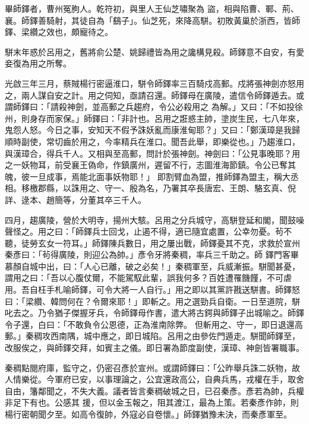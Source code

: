 \begin{pinyinscope}
 畢師鐸者，曹州冤朐人。乾符初，與里人王仙芝嘯聚為
 盜，相與陷曹、鄆、荊、襄。師鐸善騎射，其徒自為「鷂子」。仙芝死，來降高駢。初敗黃巢於浙西，皆師鐸、梁纘之效也，頗寵待之。



 駢末年惑於呂用之，舊將俞公楚、姚歸禮皆為用之讒構見殺。師鐸意不自安，有愛妾復為用之所奪。



 光啟三年三月，蔡賊楊行密逼淮口，駢令師鐸率三百騎戍高郵。戍將張神劍亦怒用之，兩人謀自安之計。用之伺知，亟請召還。師鐸母在廣陵，遣信令師鐸遁去。或謂師鐸曰：「請殺神劍，並高郵之兵趨府，令公必殺用之
 為解。」又曰：「不如投徐州，則身存而家保。」師鐸曰：「非計也。呂用之誑惑主帥，塗炭生民，七八年來，鬼怨人怒。今日之事，安知天不假予誅妖亂而康淮甸耶？」又曰：「鄭漢璋是我歸順時副使，常切齒於用之，今率精兵在淮口。聞吾此舉，即樂從也。」乃趨淮口，與漢璋合，得兵千人。又相與至高郵，問計於張神劍。神劍曰：「公見事晚耶？用之一妖物耳，前受襄王偽命，作鎮廣州，遲留不行，志圖淮海節鎮。令公已奪其魄，彼一旦成事，焉能北面事妖物耶！」
 即割臂血為盟，推師鐸為盟主，稱大丞相。移檄郡縣，以誅用之、守一、殷為名，乃署其卒長唐宏、王朗、駱玄真、倪詳、逯本、趙簡等，分董其卒三千人。



 四月，趨廣陵，營於大明寺，揚州大駭。呂用之分兵城守，高駢登延和閣，聞鼓噪聲怪之。用之曰：「師鐸兵士回戈，止遏不得，適已隨宜處置，公幸勿憂。茍不聽，徒勞玄女一符耳。」師鐸陳兵數日，用之屢出戰，師鐸憂其不克，求救於宣州秦彥曰：「茍得廣陵，則迎公為帥。」彥令牙將秦稠，率兵三千助之。師
 鐸門客畢慕顏自城中出，曰：「人心已離，破之必矣！」秦稠軍至，兵威漸振。駢聞甚憂，謂用之曰：「吾以心腹仗爾，不能駕馭此輩，誤我何多？百姓遭罹饑饉，不可虐用。吾自枉手札喻師鐸，可令大將一人自行。」用之即以其黨許戡送駢書。師鐸怒曰：「梁纘、韓問何在？令爾來耶！」即斬之。用之選勁兵自衛。一日至道院，駢叱去之。乃令猶子傑握牙兵，令師鐸母作書，遣大將古鍔與師鐸子出城喻之。師鐸令子還，白曰：「不敢負令公恩德，正為淮南除弊。
 但斬用之、守一，即日退還高郵。」秦稠攻西南隅，城中應之，即日城陷。呂用之由參佐門遁走。駢聞師鐸至，改服俟之，與師鐸交拜，如賓主之儀。即日署為節度副使，漢璋、神劍皆署職事。



 秦稠點閱府庫，監守之，仍密召彥於宣州。或謂師鐸曰：「公昨舉兵誅二妖物，故人情樂從。今軍府已安，以事理論之，公宜還政高公，自典兵馬，戎權在手，取舍自由，籓鄰聞之，不失大義。議者皆言秦稠破城之日，已召秦彥。彥若為帥，兵權非足下有也。公感其
 援，但以金玉報之，阻其渡江，最為上策。若秦彥作帥，則楊行密朝聞夕至。如高令復帥，外寇必自卷懷。」師鐸猶豫未決，而秦彥軍至。




\end{pinyinscope}
